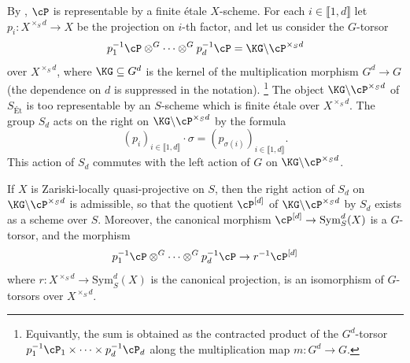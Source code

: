 By , $\cP$ is representable by a finite étale $X$-scheme.
For each $i \in  \llbracket 1, d \rrbracket$ let $p_i : X^{\times_S d} \to X$ be the projection on $i$-th factor, and let us consider the $G$-torsor
\[
p_1^{-1}\cP \otimes^G \cdots \otimes^G p_d^{-1}\cP = \KG \backslash \cP^{\times_S d}
\]
over $X^{\times_S d}$, where $\KG \subseteq G^d$ is the kernel of the multiplication morphism $G^d \to G$ (the dependence on $d$ is suppressed in the notation).
\footnote{
    Equivantly, the sum is obtained as the contracted product of the $G^d$-torsor $p_1^{-1}\cP_1 \times \dots \times p_d^{-1}\cP_d$ along the multiplication map
$m: G^d \to G$. }
The object $\KG \backslash \cP^{\times_S d}$ of $S_{\text{Ét}}$ is too representable by an $S$-scheme which is finite étale over $X^{\times_S d}$.
The group ${S}_d$ acts on the right on $\KG \backslash \cP^{\times_S d}$ by the formula
\[
(p_i)_{i \in \llbracket 1, d \rrbracket} \cdot \sigma = (p_{\sigma(i)})_{i \in \llbracket 1, d \rrbracket}.
\]
This action of ${S}_d$ commutes with the left action of $G$ on $\KG \backslash \cP^{\times_S d}$.

\medskip

\begin{prop}\label{prop:symmetric_power_torsor}
If $X$ is Zariski-locally quasi-projective on $S$, then the right action of ${S}_d$ on $\KG \backslash \cP^{\times_S d}$ is admissible,
so that the quotient $\cP^{[d]}$ of $\KG \backslash \cP^{\times_S d}$ by ${S}_d$ exists as a scheme over $S$.
Moreover, the canonical morphism $\cP^{[d]} \to \mathrm{Sym}_S^d(X)$ is a $G$-torsor, 
and the morphism
\[
p_1^{-1}\cP \otimes^G \cdots \otimes^G p_d^{-1}\cP \to r^{-1}\cP^{[d]}
\]
where $r : X^{\times_S d} \to \mathrm{Sym}_S^d(X)$ is the canonical projection, is an isomorphism of $G$-torsors over $X^{\times_S d}$.
\end{prop}


